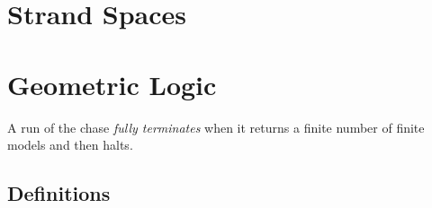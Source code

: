 \documentclass[12pt]{article}
\def\term{\emph}
\begin{document}
\section{Strand Spaces}



\section{Geometric Logic}

A run of the chase \term{fully terminates} when it returns a finite
number of finite models and then halts.


\subsection{Definitions}
\end{document}
